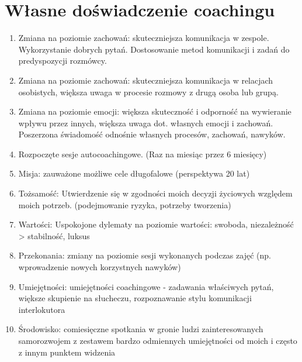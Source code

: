 
\section{Własne doświadczenie coachingu}


\begin{enumerate}
  \item Zmiana na poziomie zachowań: skuteczniejsza komunikacja w zespole. Wykorzystanie dobrych pytań. Dostosowanie
      metod komunikacji i zadań do predyspozycji rozmówcy.
  \item Zmiana na poziomie zachowań: skuteczniejsza komunikacja w relacjach osobistych, większa uwaga w procesie rozmowy
      z drugą osoba lub grupą.
  \item Zmiana na poziomie emocji: większa skuteczność i odporność na wywieranie wpływu przez innych, większa uwaga dot.
      własnych emocji i zachowań. Poszerzona świadomość odnośnie własnych procesów, zachowań, nawyków.
  \item Rozpoczęte sesje autocoachingowe. (Raz na miesiąc przez 6 miesięcy)
  \item Misja: zauważone możliwe cele długofalowe (perspektywa 20 lat)
  \item Tożsamość: Utwierdzenie się w zgodności moich decyzji życiowych względem moich potrzeb. (podejmowanie ryzyka,
      potrzeby tworzenia)
  \item Wartości: Uspokojone dylematy na poziomie wartości: swoboda, niezależność > stabilność, luksus
  \item Przekonania: zmiany na poziomie sesji wykonanych podczas zajęć (np. wprowadzenie nowych korzystnych nawyków)
  \item Umiejętności: umiejętności coachingowe - zadawania właściwych pytań, większe skupienie na słucheczu, rozpoznawanie
      stylu komunikacji interlokutora
  \item Środowisko: comiesięczne spotkania w gronie ludzi zainteresowanych samorozwojem z zestawem bardzo odmiennych umiejętności od moich
      i często z innym punktem widzenia
\end{enumerate}

